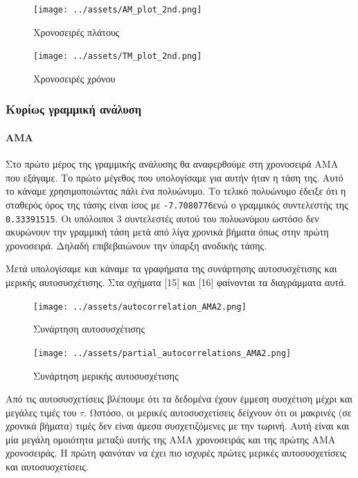 \documentclass[11pt,]{article}
\let\oldparagraph\paragraph
\renewcommand{\paragraph}[1]{\oldparagraph{#1}\mbox{}}
\begin{document}
\begin{figure}
\centering
\texttt{[image: ../assets/AM\_plot\_2nd.png]}
\caption{Χρονοσειρές πλάτους}
\end{figure}

\begin{figure}
\centering
\texttt{[image: ../assets/TM\_plot\_2nd.png]}
\caption{Χρονοσειρές χρόνου}
\end{figure}

\hypertarget{ux3baux3c5ux3c1ux3afux3c9ux3c2-ux3b3ux3c1ux3b1ux3bcux3bcux3b9ux3baux3ae-ux3b1ux3bdux3acux3bbux3c5ux3c3ux3b7-1}{%
\subsubsection{Κυρίως γραμμική
ανάλυση}\label{ux3baux3c5ux3c1ux3afux3c9ux3c2-ux3b3ux3c1ux3b1ux3bcux3bcux3b9ux3baux3ae-ux3b1ux3bdux3acux3bbux3c5ux3c3ux3b7-1}}

\hypertarget{ama-1}{%
\paragraph{AMA}\label{ama-1}}

Στο πρώτο μέρος της γραμμικής ανάλυσης θα αναφερθούμε στη χρονοσειρά AMA
που εξάγαμε. Το πρώτο μέγεθος που υπολογίσαμε για αυτήν ήταν η τάση της.
Αυτό το κάναμε χρησιμοποιώντας πάλι ένα πολυώνυμο. Το τελικό πολυώνυμο
έδειξε ότι η σταθερός όρος της τάσης είναι ίσος με
\texttt{-7.7080776}ενώ ο γραμμικός συντελεστής της \texttt{0.33391515}.
Οι υπόλοιποι 3 συντελεστές αυτού του πολυωνύμου ωστόσο δεν ακυρώνουν την
γραμμική τάση μετά από λίγα χρονικά βήματα όπως στην πρώτη χρονοσειρά.
Δηλαδή επιβεβαιώνουν την ύπαρξη ανοδικής τάσης.

Μετά υπολογίσαμε και κάναμε τα γραφήματα της συνάρτησης αυτοσυσχέτισης
και μερικής αυτοσυσχέτισης. Στα σχήματα {[}15{]} και {[}16{]} φαίνονται
τα διαγράμματα αυτά.

\begin{figure}
\centering
\texttt{[image: ../assets/autocorrelation\_AMA2.png]}
\caption{Συνάρτηση αυτοσυσχέτισης}
\end{figure}

\begin{figure}
\centering
\texttt{[image: ../assets/partial\_autocorrelations\_AMA2.png]}
\caption{Συνάρτηση μερικής αυτοσυσχέτισης}
\end{figure}

Από τις αυτοσυσχετίσεις βλέπουμε ότι τα δεδομένα έχουν έμμεση συσχέτιση
μέχρι και μεγάλες τιμές του \(\tau\). Ωστόσο, οι μερικές αυτοσυσχετίσεις
δείχνουν ότι οι μακρινές (σε χρονικά βήματα) τιμές δεν είναι άμεσα
συσχετιζόμενες με την τωρινή. Αυτή είναι και μία μεγάλη ομοιότητα μεταξύ
αυτής της AMA χρονοσειράς και της πρώτης AMA χρονοσειράς. Η πρώτη
φαινόταν να έχει πιο ισχυρές πρώτες μερικές αυτοσυσχετίσεις και
αυτοσυσχετίσεις.
\end{document}

